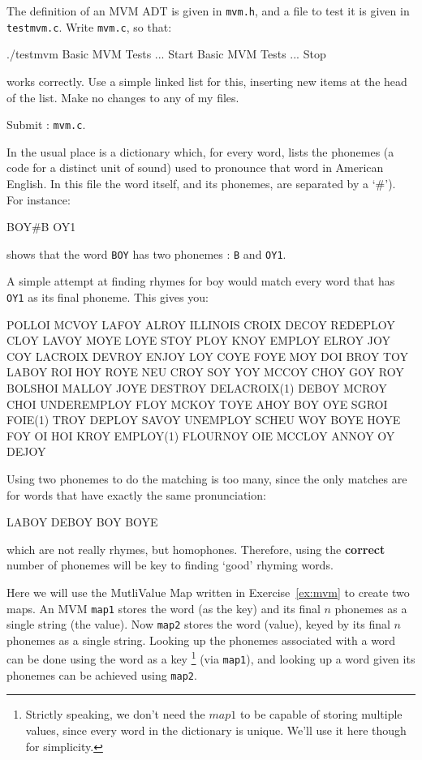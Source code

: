 \begin{exercise}
\label{ex:mvm}
The definition of an MVM ADT is given in \verb^mvm.h^, and a file to test it is given
in \verb^testmvm.c^.  Write \verb^mvm.c^, so that:
{\small
\begin{terminaloutput}
./testmvm
Basic MVM Tests ... Start
Basic MVM Tests ... Stop
\end{terminaloutput}
}
\noindent works correctly. Use a simple linked list for this, inserting
new items at the head of the list.
Make no changes to any of my files.

Submit : \verb^mvm.c^.
\end{exercise}


In the usual place is a dictionary which, for every word, lists the
phonemes (a code for a distinct unit of sound) used to pronounce that word
in American English. In this file the word itself, and its phonemes,
are separated by a `\#').  For instance:
\begin{codesnippet}
BOY#B OY1
\end{codesnippet}
shows that the word \verb^BOY^ has two phonemes : \verb^B^ and \verb^OY1^.

A simple attempt at finding rhymes for boy would match every word that has \verb^OY1^
as its final phoneme. This gives you:
\begin{terminaloutput}
POLLOI MCVOY LAFOY ALROY ILLINOIS CROIX DECOY REDEPLOY CLOY
LAVOY MOYE LOYE STOY PLOY KNOY EMPLOY ELROY JOY COY LACROIX
DEVROY ENJOY LOY COYE FOYE MOY DOI BROY TOY LABOY ROI HOY
ROYE NEU CROY SOY YOY MCCOY CHOY GOY ROY BOLSHOI MALLOY JOYE
DESTROY DELACROIX(1) DEBOY MCROY CHOI UNDEREMPLOY FLOY MCKOY
TOYE AHOY BOY OYE SGROI FOIE(1) TROY DEPLOY SAVOY UNEMPLOY
SCHEU WOY BOYE HOYE FOY OI HOI KROY EMPLOY(1) FLOURNOY OIE
MCCLOY ANNOY OY DEJOY
\end{terminaloutput}

Using two phonemes to do the matching is too many,
since the only matches are for words that have exactly the same pronunciation: 
\begin{terminaloutput}
LABOY DEBOY BOY BOYE
\end{terminaloutput}
which are not really rhymes, but homophones. Therefore, using
the {\bf correct} number of phonemes will be key to finding
`good' rhyming words.

Here we will use the MutliValue Map written in Exercise~\ref{ex:mvm} to
create two maps.  An MVM \verb^map1^ stores the word (as the key) and its final
$n$ phonemes as a single string (the value).  Now \verb^map2^ stores the
word (value), keyed by its final $n$ phonemes as a single string.
Looking up the phonemes associated with a word can be done using
the word as a key
\footnote{Strictly speaking, we don't need the
$map1$ to be capable of storing multiple values, since every word
in the dictionary is unique. We'll use it here though for simplicity.}
(via \verb^map1^), and looking up a word given its phonemes can be
achieved using \verb^map2^.

